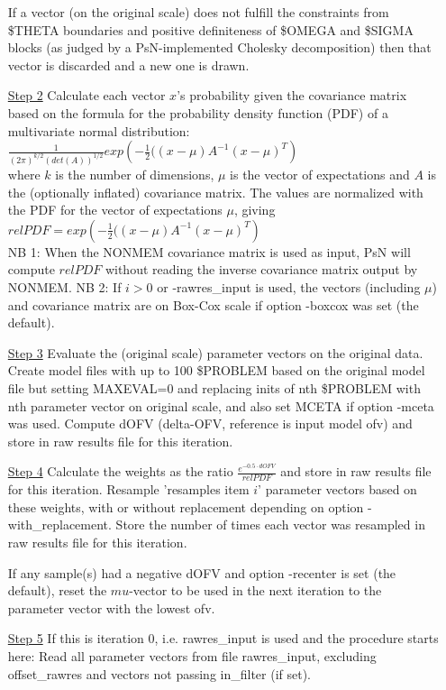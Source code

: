 \begin{itemize}
\noindent If a vector (on the original scale) does not fulfill the constraints from \$THETA boundaries
and positive definiteness of \$OMEGA and
\$SIGMA blocks (as judged by a PsN-implemented Cholesky decomposition) 
then that vector is 
discarded and a new one is drawn.
\item[\underline{Step 2}] 
Calculate each vector $x$’s probability 
given the covariance matrix based on the formula for the probability 
density function (PDF) of a multivariate normal distribution:\\
\begin{math}
\frac{1}{\left(2\pi\right)^{k/2}\left(det\left(A\right)\right)^{1/2}} exp\left(-\frac{1}{2}(\left(x-\mu\right)A^{-1} \left(x-\mu\right)^T\right)
\end{math}
\\
where $k$ is the number of dimensions, 
$\mu$ is the vector of expectations and $A$ is the (optionally inflated) covariance matrix.
The values are normalized with the PDF for the vector of expectations $\mu$, giving\\
\begin{math}
relPDF=exp\left(-\frac{1}{2}(\left(x-\mu\right)A^{-1} \left(x-\mu\right)^T\right)
\end{math}
\\
NB 1: When the NONMEM covariance matrix is used as input, PsN will compute $relPDF$ without reading the inverse covariance matrix
output by NONMEM.
NB 2: If $i>0$ or -rawres\_input is used, the vectors (including $\mu$) and covariance matrix are on Box-Cox scale if option -boxcox was set (the default).
\item[\underline{Step 3}] 
Evaluate the (original scale) parameter vectors on the original data.
Create model files with up to 100 \$PROBLEM based on the original model file but setting MAXEVAL=0
and replacing inits of nth \$PROBLEM with nth parameter vector on original scale, and also set MCETA if option -mceta was used. Compute dOFV 
(delta-OFV, reference is input model ofv) and store in raw results file for this iteration.
\item[\underline{Step 4}] 
Calculate the weights as the ratio $\frac{e^{-0.5\cdot dOFV}}{relPDF}$ and store in raw results file for this iteration. 
Resample 'resamples item $i$' parameter vectors based on these weights, with or without replacement depending on option 
-with\_replacement. 
Store the number of times each vector was resampled in raw results file for this iteration.

\noindent If any sample(s) had a negative dOFV and option -recenter is set (the default), reset the $mu$-vector
to be used in the next iteration to the parameter vector with the lowest ofv.
\item[\underline{Step 5}]
If this is iteration $0$, i.e. rawres\_input is used and the procedure starts here: Read all parameter vectors
from file rawres\_input, excluding offset\_rawres and vectors not passing in\_filter (if set).


\end{itemize}
